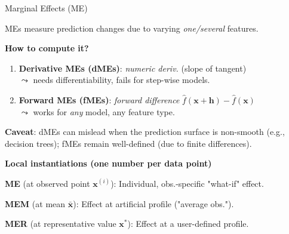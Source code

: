 \documentclass[10pt,compress,t,notes=noshow, xcolor=table]{beamer}
\begin{document}



\begin{framei}[align=top]{Marginal Effects (ME)  }
\item %
MEs measure prediction changes due to varying \emph{one/several} features.
\item \textbf{How to compute it?}
\begin{enumerate}
\item \textbf{Derivative MEs (dMEs)}: \emph{numeric deriv.} (slope of tangent) \\
$\leadsto$ needs differentiability, fails for step-wise models.
\item \textbf{Forward MEs (fMEs)}: \emph{forward difference} $\hat f(\boldsymbol x+\boldsymbol h)-\hat f(\boldsymbol x)$ \\
$\leadsto$ works for \emph{any} model, any feature type.
\end{enumerate}
\item \textbf{Caveat}: dMEs can mislead when the prediction surface is non-smooth (e.g., decision trees); fMEs remain well-defined (due to finite differences).
\pause
\item \textbf{Local instantiations (one number per data point)}
\begin{itemizeS}
\item \textbf{ME} (at observed point $\boldsymbol{x}^{(i)}$): Individual, obs.-specific "what-if" effect.
\item \textbf{MEM} (at mean $\bar{\boldsymbol{x}}$): Effect at artificial profile ("average obs.").
\item \textbf{MER} (at representative value $\boldsymbol{x}^{*}$): Effect at a user-defined profile.
\end{itemizeS}

\end{framei}
\end{document}
